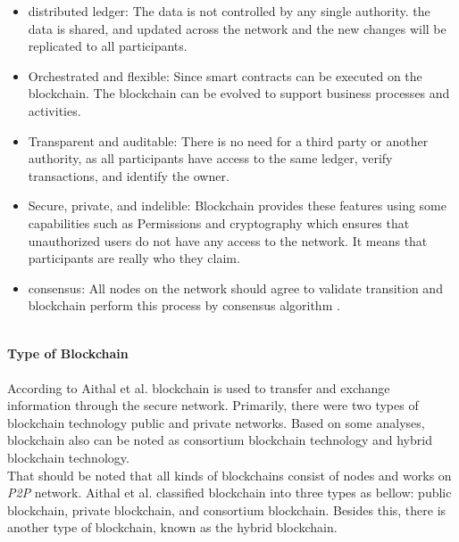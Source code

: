 \begin{itemize}
    \item distributed ledger: The data is not controlled by any single authority. the data is shared, and updated across the network and the new changes will be replicated to all participants.
    \item Orchestrated and flexible: Since smart contracts can be executed on the blockchain. The blockchain can be evolved to support business processes and activities.
    \item Transparent and auditable: There is no need for a third party or another authority, as all participants have access to the same ledger, verify transactions, and identify the owner. 
    \item Secure, private, and indelible:
    Blockchain provides these features using some capabilities such as Permissions and cryptography which ensures that  
    unauthorized users do not have any access to the network. It means that participants are really who they claim.
    \item consensus: All nodes on the network should agree to validate transition and blockchain perform this process by consensus algorithm \cite{Gupta}.
\end{itemize}
\\
\textbf{Type of Blockchain} \\
\\
According to Aithal et al.\cite{Aithal} blockchain is used to transfer and exchange information through the secure network. Primarily, there were two types of blockchain technology public and private networks. Based on some analyses, blockchain also can be noted as consortium blockchain technology and hybrid blockchain technology. \\
That should be noted that all kinds of blockchains consist of nodes and works on \textit{P2P} network. Aithal et al.\cite{Aithal} classified blockchain into three types as bellow: public blockchain, private blockchain, and consortium blockchain. Besides this, there is another type of blockchain, known as the hybrid blockchain.
